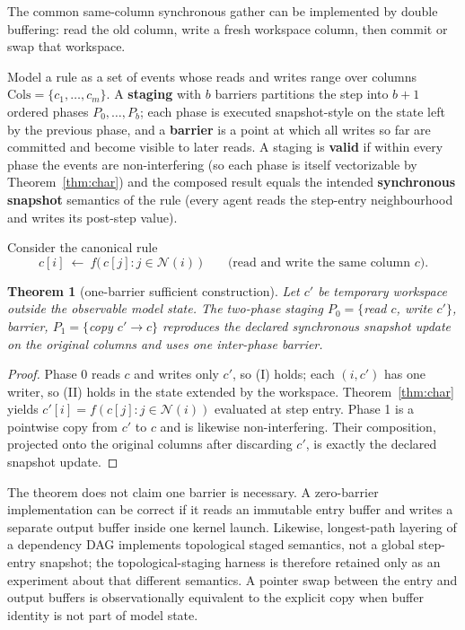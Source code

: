 \documentclass[sigconf,nonacm,review,natbib=true]{acmart}
\newtheorem{theorem}{Theorem}
\theoremstyle{definition}
\theoremstyle{plain}
\theoremstyle{remark}
\begin{document}
The common same-column synchronous gather can be implemented by double
buffering: read the old column, write a fresh workspace column, then commit or
swap that workspace.

Model a rule as a set of events whose reads and writes range over columns $\mathrm{Cols}=\{c_1,\dots,c_m\}$. A \textbf{staging} with $b$ barriers partitions the step into $b{+}1$ ordered phases $P_0,\dots,P_b$; each phase is executed snapshot-style on the state left by the previous phase, and a \textbf{barrier} is a point at which all writes so far are committed and become visible to later reads. A staging is \textbf{valid} if within every phase the events are non-interfering (so each phase is itself vectorizable by Theorem~\ref{thm:char}) and the composed result equals the intended \textbf{synchronous snapshot} semantics of the rule (every agent reads the step-entry neighbourhood and writes its post-step value).

Consider the canonical rule
\[
c[i]\ \leftarrow\ f\big(\,c[j] : j\in \mathcal N(i)\,\big)
\qquad\text{(read and write the same column $c$).}
\]

\begin{theorem}[one-barrier sufficient construction]\label{thm:stage}
Let $c'$ be temporary workspace outside the observable model state. The
two-phase staging $P_0=\{$read $c$, write $c'\}$, barrier,
$P_1=\{$copy $c'\to c\}$ reproduces the declared synchronous snapshot update
on the original columns and uses one inter-phase barrier.

\end{theorem}

\begin{proof} Phase 0 reads $c$ and writes only $c'$, so (I) holds; each
$(i,c')$ has one writer, so (II) holds in the state extended by the workspace.
Theorem~\ref{thm:char} yields
$c'[i]=f(c[j]:j\in\mathcal N(i))$ evaluated at step entry. Phase 1 is a
pointwise copy from $c'$ to $c$ and is likewise non-interfering. Their
composition, projected onto the original columns after discarding $c'$, is
exactly the declared snapshot update.\end{proof}

The theorem does not claim one barrier is necessary. A zero-barrier
implementation can be correct if it reads an immutable entry buffer and writes
a separate output buffer inside one kernel launch. Likewise, longest-path
layering of a dependency DAG implements topological staged semantics, not a
global step-entry snapshot; the topological-staging harness is therefore
retained only as an experiment about that different semantics.
A pointer swap between the entry and output buffers is observationally
equivalent to the explicit copy when buffer identity is not part of model state.
\end{document}
